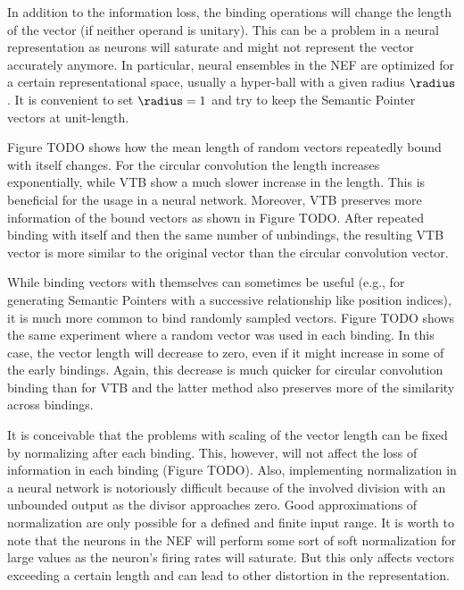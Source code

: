 In addition to the information loss, the binding operations will change the length of the vector (if neither operand is unitary).
This can be a problem in a neural representation as neurons will saturate and might not represent the vector accurately anymore.
In particular, neural ensembles in the NEF are optimized for a certain representational space, usually a hyper-ball with a given radius $\radius$.
It is convenient to set $\radius = 1$ and try to keep the Semantic Pointer vectors at unit-length.

Figure TODO shows how the mean length of random vectors repeatedly bound with itself changes.
For the circular convolution the length increases exponentially, while VTB show a much slower increase in the length.
This is beneficial for the usage in a neural network.
Moreover, VTB preserves more information of the bound vectors as shown in Figure TODO\@.
After repeated binding with itself and then the same number of unbindings, the resulting VTB vector is more similar to the original vector than the circular convolution vector.

While binding vectors with themselves can sometimes be useful (e.g., for generating Semantic Pointers with a successive relationship like position indices), it is much more common to bind randomly sampled vectors.
Figure TODO shows the same experiment where a random vector was used in each binding.
In this case, the vector length will decrease to zero, even if it might increase in some of the early bindings.
Again, this decrease is much quicker for circular convolution binding than for VTB and the latter method also preserves more of the similarity across bindings.

It is conceivable that the problems with scaling of the vector length can be fixed by normalizing after each binding.
This, however, will not affect the loss of information in each binding (Figure TODO).
Also, implementing normalization in a neural network is notoriously difficult because of the involved division with an unbounded output as the divisor approaches zero.
Good approximations of normalization are only possible for a defined and finite input range.
It is worth to note that the neurons in the NEF will perform some sort of soft normalization for large values as the neuron's firing rates will saturate.
But this only affects vectors exceeding a certain length and can lead to other distortion in the representation.

